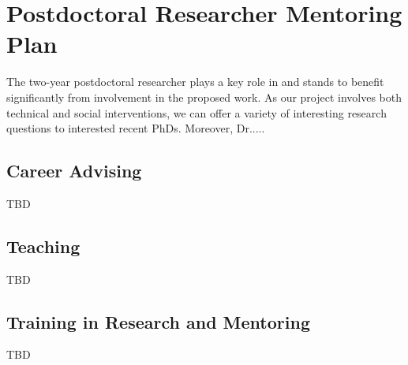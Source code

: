 
\section*{Postdoctoral Researcher Mentoring Plan}

The two-year postdoctoral researcher plays a key role in and stands to benefit
significantly from involvement in the proposed work. As our project involves both
technical and social interventions, we can offer a variety of interesting research
questions to interested recent PhDs. Moreover, Dr.....

\subsection*{Career Advising}
TBD

\subsection*{Teaching}
TBD

\subsection*{Training in Research and Mentoring}
TBD
